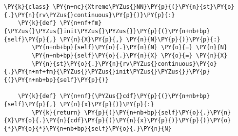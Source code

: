     \begin{tcolorbox}[breakable, size=fbox, boxrule=1pt, pad at break*=1mm,colback=cellbackground, colframe=cellborder]
\begin{Verbatim}[commandchars=\\\{\}]
\PY{k}{class} \PY{n+nc}{Xtreme\PYZus{}NN}\PY{p}{(}\PY{n}{st}\PY{o}{.}\PY{n}{rv\PYZus{}continuous}\PY{p}{)}\PY{p}{:}
    \PY{k}{def} \PY{n+nf+fm}{\PYZus{}\PYZus{}init\PYZus{}\PYZus{}}\PY{p}{(}\PY{n+nb+bp}{self}\PY{p}{,} \PY{n}{X}\PY{p}{,} \PY{n}{N}\PY{p}{)}\PY{p}{:}
        \PY{n+nb+bp}{self}\PY{o}{.}\PY{n}{N} \PY{o}{=} \PY{n}{N}
        \PY{n+nb+bp}{self}\PY{o}{.}\PY{n}{X} \PY{o}{=} \PY{n}{X}
        \PY{n}{st}\PY{o}{.}\PY{n}{rv\PYZus{}continuous}\PY{o}{.}\PY{n+nf+fm}{\PYZus{}\PYZus{}init\PYZus{}\PYZus{}}\PY{p}{(}\PY{n+nb+bp}{self}\PY{p}{)}

    \PY{k}{def} \PY{n+nf}{\PYZus{}cdf}\PY{p}{(}\PY{n+nb+bp}{self}\PY{p}{,} \PY{n}{x}\PY{p}{)}\PY{p}{:}
        \PY{k}{return} \PY{p}{(}\PY{n+nb+bp}{self}\PY{o}{.}\PY{n}{X}\PY{o}{.}\PY{n}{cdf}\PY{p}{(}\PY{n}{x}\PY{p}{)}\PY{p}{)}\PY{o}{*}\PY{o}{*}\PY{n+nb+bp}{self}\PY{o}{.}\PY{n}{N}
\end{Verbatim}
\end{tcolorbox}

